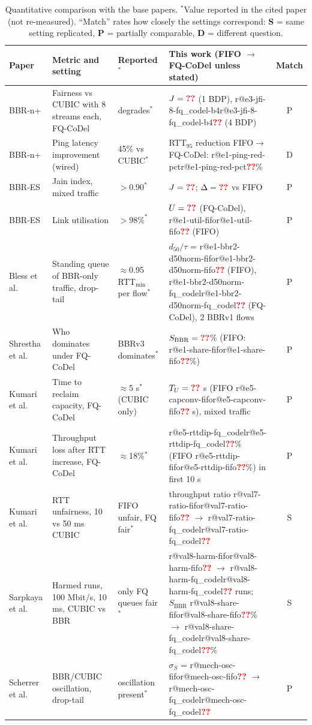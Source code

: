 \documentclass[conference]{IEEEtran}
\makeatletter
\newcommand{\R}[1]{\ifcsname r@#1\endcsname\csname r@#1\endcsname\else\textcolor{red}{\textbf{??}}\fi}
\newcommand{\SB}{S_{\mathrm{BBR}}}
\makeatother
\begin{document}
\begin{table}[t]
\centering
\caption{Quantitative comparison with the base papers. $^{*}$Value reported in the cited paper (not re-measured). ``Match'' rates how closely the settings correspond: \textbf{S} = same setting replicated, \textbf{P} = partially comparable, \textbf{D} = different question.}
\label{tab:quant}
\footnotesize
\setlength{\tabcolsep}{3pt}
\begin{tabular}{@{}p{24mm}p{47mm}p{30mm}p{55mm}c@{}}
\toprule
Paper & Metric and setting & Reported$^{*}$ & This work (FIFO $\rightarrow$ FQ-CoDel unless stated) & Match \\
\midrule
\cite{ahsan2026bbrn} BBR-n+ & Fairness vs CUBIC with 8 streams each, FQ-CoDel & degrades$^{*}$ & $J=\R{e3-jfi-8-fq_codel-b1}$ (1 BDP), \R{e3-jfi-8-fq_codel-b4} (4 BDP) & P \\
\cite{ahsan2026bbrn} BBR-n+ & Ping latency improvement (wired) & 45\% vs CUBIC$^{*}$ & RTT$_{95}$ reduction FIFO$\rightarrow$FQ-CoDel: \R{e1-ping-red-pct}\% & D \\
\cite{han2026bbres} BBR-ES & Jain index, mixed traffic & $>0.90^{*}$ & $J=\R{e1-jfi-fq}$; $\Delta=\R{e1-jfi-dabs}$ vs FIFO & P \\
\cite{han2026bbres} BBR-ES & Link utilisation & $>98\%^{*}$ & $U=\R{e1-util-fq}$ (FQ-CoDel), \R{e1-util-fifo} (FIFO) & P \\
\cite{bless2025bbrv3} Bless et al. & Standing queue of BBR-only traffic, drop-tail & $\approx$0.95 RTT$_{\min}$ per flow$^{*}$ & $d_{50}/\tau$ = \R{e1-bbr2-d50norm-fifo} (FIFO), \R{e1-bbr2-d50norm-fq_codel} (FQ-CoDel), 2 BBRv1 flows & P \\
\cite{shrestha2025wifi} Shrestha et al. & Who dominates under FQ-CoDel & BBRv3 dominates$^{*}$ & $\SB=\R{e1-share-fq}$\% (FIFO: \R{e1-share-fifo}\%) & P \\
\cite{kumari2025cubic} Kumari et al. & Time to reclaim capacity, FQ-CoDel & $\approx$5 s$^{*}$ (CUBIC only) & $T_U=\R{e5-capconv-fq_codel}$ s (FIFO \R{e5-capconv-fifo} s), mixed traffic & P \\
\cite{kumari2025cubic} Kumari et al. & Throughput loss after RTT increase, FQ-CoDel & $\approx$18\%$^{*}$ & \R{e5-rttdip-fq_codel}\% (FIFO \R{e5-rttdip-fifo}\%) in first 10 s & P \\
\cite{kumari2025cubic} Kumari et al. & RTT unfairness, 10 vs 50 ms CUBIC & FIFO unfair, FQ fair$^{*}$ & throughput ratio \R{val7-ratio-fifo} $\rightarrow$ \R{val7-ratio-fq_codel} & S \\
\cite{sarpkaya2025l4s} Sarpkaya et al. & Harmed runs, 100 Mbit/s, 10 ms, CUBIC vs BBR & only FQ queues fair$^{*}$ & \R{val8-harm-fifo} $\rightarrow$ \R{val8-harm-fq_codel} runs; $\SB$ \R{val8-share-fifo}\% $\rightarrow$ \R{val8-share-fq_codel}\% & S \\
\cite{scherrer2026control} Scherrer et al. & BBR/CUBIC oscillation, drop-tail & oscillation present$^{*}$ & $\sigma_S$ = \R{mech-osc-fifo} $\rightarrow$ \R{mech-osc-fq_codel} & P \\
\bottomrule
\end{tabular}
\end{table}
\end{document}
